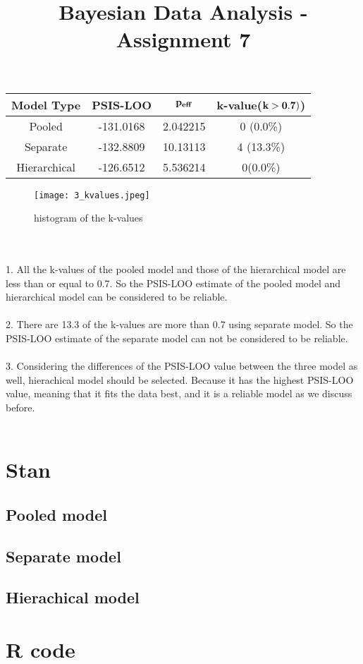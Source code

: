 \documentclass[article,11pt]{article}
\title{\huge Bayesian Data Analysis - Assignment 7}
\begin{document}
 \maketitle
\begin{table}[h]
	\centering
	\begin{tabular}{|c|c|c|c|}
		\hline
		\textbf{Model Type} & \textbf{PSIS-LOO} & \textbf{$\bf{p_{eff}}$} & \textbf{k-value($\bf{k>0.7})$)}   \\ \hline\hline
		Pooled  & -131.0168 &2.042215  &  0 (0.0\%)    \\ \hline
		Separate & -132.8809 & 10.13113 &   4 (13.3\%)  \\ \hline
		Hierarchical &-126.6512  & 5.536214  &  0(0.0\%) \\ \hline
	\end{tabular}
	\label{tab:t1}
\end{table}
\begin{figure}[H]
	\centering
	\captionsetup{justification=centering}
	\texttt{[image: 3\_kvalues.jpeg]}
	\caption{histogram of the k-values}
\end{figure}
\\ \\
1. All the k-values of the pooled model and those of the hierarchical model are less than or equal to 0.7. So the PSIS-LOO estimate of the pooled model and hierarchical model can be considered to be reliable.\\ \\
2. There are 13.3 of the k-values are more than 0.7 using separate model. So the PSIS-LOO estimate of the separate model can not be considered to be reliable. \\ \\ 
3. Considering the differences of the PSIS-LOO value between the three model as well, hierachical model should be selected. Because it has the highest PSIS-LOO value, meaning that it fits the data best, and it is a reliable model as we discuss before.
\\
\\
\appendix
{}
\section{Stan}
\subsection{Pooled model}

\subsection{Separate model}

\subsection{Hierachical model}
	
\section{R code}

\end{document}
